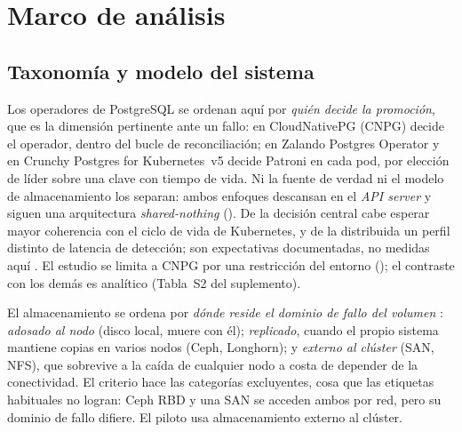 \section{Marco de análisis}\label{sec:marco}
\subsection{Taxonomía y modelo del sistema}\label{sec:taxo}
Los operadores de PostgreSQL se ordenan aquí por \emph{quién decide la promoción}, que es la dimensión pertinente ante un fallo: en CloudNativePG (CNPG) decide el operador, dentro del bucle de reconciliación; en Zalando Postgres Operator y en Crunchy Postgres for Kubernetes~v5 decide Patroni en cada pod, por elección de líder sobre una clave con tiempo de vida. Ni la fuente de verdad ni el modelo de almacenamiento los separan: ambos enfoques descansan en el \textit{API server} y siguen una arquitectura \textit{shared-nothing} (). De la decisión central cabe esperar mayor coherencia con el ciclo de vida de Kubernetes, y de la distribuida un perfil distinto de latencia de detección; son expectativas documentadas, no medidas aquí \citep{dobies2020,k8s2026operator}. El estudio se limita a CNPG por una restricción del entorno (); el contraste con los demás es analítico (Tabla~S2 del suplemento).

El almacenamiento se ordena por \emph{dónde reside el dominio de fallo del volumen} \citep{k8s2024csi}: \textit{adosado al nodo} (disco local, muere con él); \textit{replicado}, cuando el propio sistema mantiene copias en varios nodos (Ceph, Longhorn); y \textit{externo al clúster} (SAN, NFS), que sobrevive a la caída de cualquier nodo a costa de depender de la conectividad. El criterio hace las categorías excluyentes, cosa que las etiquetas habituales no logran: Ceph RBD y una SAN se acceden ambos por red, pero su dominio de fallo difiere. El piloto usa almacenamiento externo al clúster.

